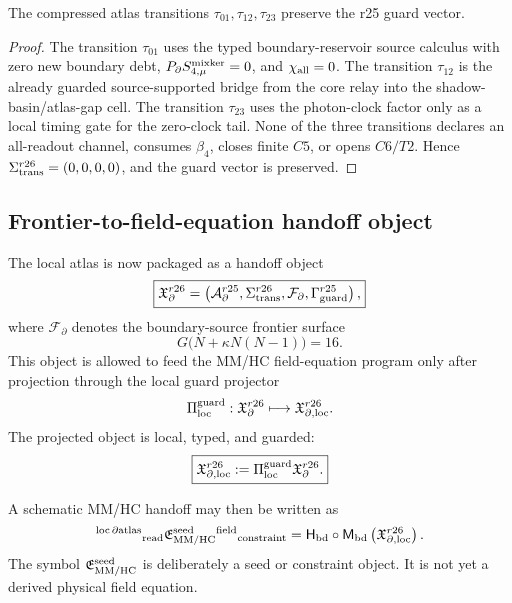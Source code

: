\begin{lemma}
\label{lem:v470-r26-transition-seam-preservation}
The compressed atlas transitions \(\tau_{01},\tau_{12},\tau_{23}\) preserve the
r25 guard vector.
\end{lemma}

\begin{proof}
The transition \(\tau_{01}\) uses the typed boundary-reservoir source calculus
with zero new boundary debt, \(P_{\partial}S_{4,\mu}^{\rm mixker}=0\), and
\(\chi_{\rm all}=0\).  The transition \(\tau_{12}\) is the already guarded
source-supported bridge from the core relay into the shadow-basin/atlas-gap
cell.  The transition \(\tau_{23}\) uses the photon-clock factor only as a local
timing gate for the zero-clock tail.  None of the three transitions declares an
all-readout channel, consumes \(\beta_4\), closes finite \(C5\), or opens
\(C6/T2\).  Hence \(\Sigma_{\rm trans}^{r26}=(0,0,0,0)\), and the guard vector
is preserved.
\end{proof}

\subsection{Frontier-to-field-equation handoff object}
\label{subsec:v470-r26-frontier-field-handoff}

The local atlas is now packaged as a handoff object
\[
\boxed{
\mathfrak X_{\partial}^{r26}
=
\left(
\mathcal A_{\partial}^{r25},
\Sigma_{\rm trans}^{r26},
\mathcal F_{\partial},
\Gamma_{\rm guard}^{r25}
\right),
}
\]
where \(\mathcal F_{\partial}\) denotes the boundary-source frontier surface
\[
\boxed{
G\bigl(N+\kappa N(N-1)\bigr)=16.
}
\]
This object is allowed to feed the MM/HC field-equation program only after
projection through the local guard projector
\[
\Pi_{\rm loc}^{\rm guard}:
\mathfrak X_{\partial}^{r26}
\longmapsto
\mathfrak X_{\partial,\rm loc}^{r26}.
\]
The projected object is local, typed, and guarded:
\[
\boxed{
\mathfrak X_{\partial,\rm loc}^{r26}
:=
\Pi_{\rm loc}^{\rm guard}\mathfrak X_{\partial}^{r26}.
}
\]

A schematic MM/HC handoff may then be written as
\[
{}^{\mathrm{loc}\,\partial\mathrm{atlas}}{}_{\mathrm{read}}
\mathfrak E_{\rm MM/HC}^{\rm seed}
{}^{\mathrm{field}}{}_{\mathrm{constraint}}
=
\mathsf H_{\rm bd}\circ\mathsf M_{\rm bd}
\left(\mathfrak X_{\partial,\rm loc}^{r26}\right).
\]
The symbol \(\mathfrak E_{\rm MM/HC}^{\rm seed}\) is deliberately a seed or
constraint object.  It is not yet a derived physical field equation.


